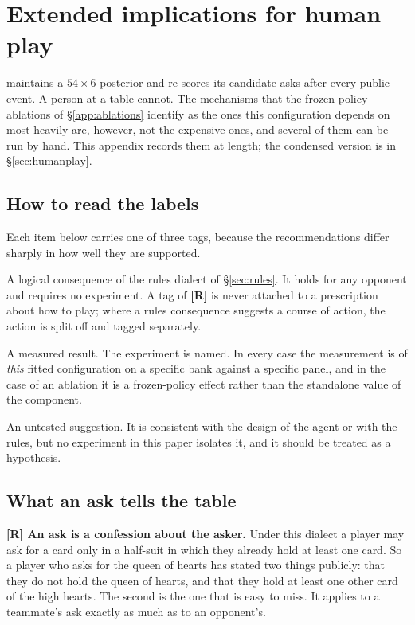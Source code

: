 \section{Extended implications for human play}
\label{app:human}

\vfast{} maintains a $54 \times 6$ posterior and re-scores its candidate asks
after every public event. A person at a table cannot. The mechanisms that the
frozen-policy ablations of \S\ref{app:ablations} identify as the ones this
configuration depends on most heavily are, however, not the expensive ones, and
several of them can be run by hand. This appendix records them at length; the
condensed version is in \S\ref{sec:humanplay}.

\subsection{How to read the labels}
\label{app:human-labels}

Each item below carries one of three tags, because the recommendations differ
sharply in how well they are supported.

\begin{description}[leftmargin=2.2em,style=nextline]
\item[\textbf{[R]}] A logical consequence of the rules dialect of
\S\ref{sec:rules}. It holds for any opponent and requires no experiment. A tag
of \textbf{[R]} is never attached to a prescription about how to play; where a
rules consequence suggests a course of action, the action is split off and
tagged separately.
\item[\textbf{[M]}] A measured result. The experiment is named. In
every case the measurement is of \emph{this} fitted configuration on a specific
bank against a specific panel, and in the case of an ablation it is a
frozen-policy effect rather than the standalone value of the component.
\item[\textbf{[U]}] An untested suggestion. It is consistent with
the design of the agent or with the rules, but no experiment in this paper
isolates it, and it should be treated as a hypothesis.
\end{description}

\subsection{What an ask tells the table}
\label{app:human-ask}

\textbf{[R] An ask is a confession about the asker.} Under this dialect a
player may ask for a card only in a half-suit in which they already hold at
least one card. So a player who asks for the queen of hearts has stated two
things publicly: that they do not hold the queen of hearts, and that they hold
at least one other card of the high hearts. The second is the one that is easy
to miss. It applies to a teammate's ask exactly as much as to an opponent's.

